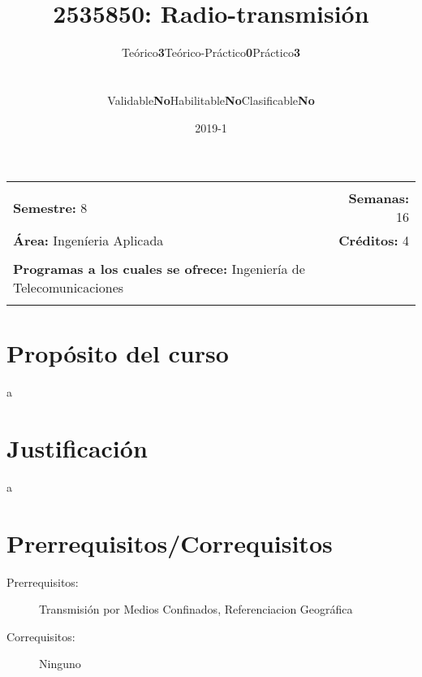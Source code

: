 \documentclass[11pt]{article}
\title{2535850: Radio-transmisión}
\author{\begin{tabular} {c|c|c|c|c|c} Teórico & \textbf{3} & Teórico-Práctico & \textbf{0} & Práctico & \textbf{3}\end{tabular}
\\
\begin{tabular} {c|c|c|c|c|c} Validable & \textbf{No} & Habilitable & \textbf{No} & Clasificable & \textbf{No}\end{tabular}}
\date{2019-1}
\newcommand{\blankline}{\quad\pagebreak[2]}
\begin{document}
\maketitle

\begin{tabular*}{.93\textwidth}{@{\extracolsep{\fill}}lr}
\hline\\

\textbf{Semestre:} 8 & \textbf{Semanas:} 16
\\
\textbf{Área:} Ingeníeria Aplicada &    \textbf{Créditos:} 4 
\\ & \\
\textbf{Programas a los cuales se ofrece:} Ingeniería de Telecomunicaciones
\\ & \\
\hline
\end{tabular*}

\vspace{5 mm}

\section*{Propósito del curso}

a



\section*{Justificación}

a

\section*{Prerrequisitos/Correquisitos}
\begin{description}
\item [Prerrequisitos:] Transmisión por Medios Confinados, Referenciacion Geográfica
\item[Correquisitos:] Ninguno
\end{description}
\end{document}
